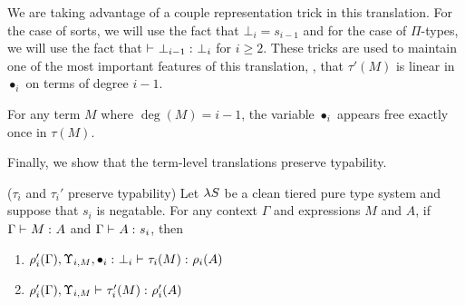 \documentclass{article}
\begin{document}
We are taking advantage of a couple representation trick in this translation.
For the case of sorts, we will use the fact that $\bot_i = s_{i - 1}$ and for the case of $\Pi$-types, we will use the fact that $\vdash_{} {{\bot_{i - 1}} :^{} {\bot_i}}$ for $i \geq 2$.
These tricks are used to maintain one of the most important features of this translation, \ie, that $\tau'(M)$ is linear in $\bullet_i$ on terms of degree $i - 1$.
\begin{lemma}
\label{lem:tau-facts}
For any term $M$ where $\deg(M) = i - 1$, the variable $\bullet_i$ appears free exactly once in $\tau(M)$.
\end{lemma}

Finally, we show that the term-level translations preserve typability.

\begin{lemma}\label{lem:tau-pres}
($\tau_i$ and $\tau_i'$ preserve typability)
Let $\lambda S$ be a clean tiered pure type system and suppose that $s_i$ is negatable.
For any context $\Gamma$ and expressions $M$ and $A$, if $\Gamma \vdash_{} {{M} :^{} {A}}$ and $\Gamma \vdash_{} {{A} :^{} {s_i}}$, then
\begin{enumerate}
    \item\label{item:tau-preserves-types-i}
        $
            \rho_i'(\Gamma), \Upsilon_{i, M},
            {{\bullet_i} :^{} {\bot_i}}
         \vdash_{} {{
            \tau_i(M)
        } :^{} {
            \rho_i(A)
        }}$
    \item\label{item:tau-preserves-types-ii}
        $
            \rho_i'(\Gamma), \Upsilon_{i, M}
         \vdash_{} {{
            \tau_i'(M)
        } :^{} {
            \rho'_i(A)
        }}$
\end{enumerate}
\end{lemma}
\end{document}
